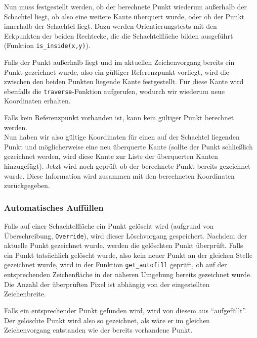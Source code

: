Nun muss festgestellt werden, ob der berechnete Punkt wiederum außerhalb der Schachtel liegt, ob also eine weitere Kante überquert wurde, oder ob der Punkt innerhalb der Schachtel liegt. Dazu werden Orientierungstests mit den Eckpunkten der beiden Rechtecke, die die Schachtelfläche bilden ausgeführt (Funktion \texttt{is\_inside(x,y)}).

Falls der Punkt außerhalb liegt und im aktuellen Zeichenvorgang bereits ein Punkt gezeichnet wurde, also ein gültiger Referenzpunkt vorliegt, wird die zwischen den beiden Punkten liegende Kante festgestellt. Für diese Kante wird ebenfalls die \texttt{traverse}-Funktion aufgerufen, wodurch wir wiederum neue Koordinaten erhalten.

Falls kein Referenzpunkt vorhanden ist, kann kein gültiger Punkt berechnet werden.\\

Nun haben wir also gültige Koordinaten für einen auf der Schachtel liegenden Punkt und möglicherweise eine neu überquerte Kante (sollte der Punkt schließlich gezeichnet werden, wird diese Kante zur Liste der überquerten Kanten hinzugefügt). Jetzt wird noch geprüft ob der berechnete Punkt bereits gezeichnet wurde. Diese Information wird zusammen mit den berechneten Koordinaten zurückgegeben.\\


\subsubsection{Automatisches Auffüllen}
\label{subsubsec:auffuellen}

Falls auf einer Schachtelfläche ein Punkt gelöscht wird (\zB aufgrund von Überschreibung, \texttt{Override}), wird dieser Löschvorgang gespeichert. Nachdem der aktuelle Punkt gezeichnet wurde, werden die gelöschten Punkt überprüft. Falls ein Punkt tatsächlich gelöscht wurde, also kein neuer Punkt an der gleichen Stelle gezeichnet wurde, wird in der Funktion \texttt{get\_autofill} geprüft, ob auf der entsprechenden Zeichenfläche in der näheren Umgebung bereits gezeichnet wurde. Die Anzahl der überprüften Pixel ist abhängig von der eingestellten Zeichenbreite.

Falls ein entsprechender Punkt gefunden wird, wird von diesem aus "`aufgefüllt"'. Der gelöschte Punkt wird also so gezeichnet, als wäre er im gleichen Zeichenvorgang entstanden wie der bereits vorhandene Punkt.


